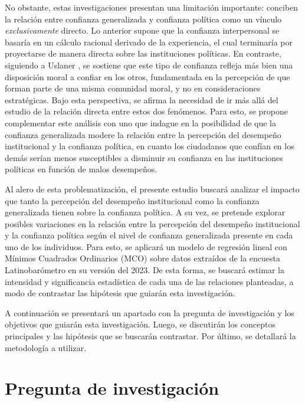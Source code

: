 \documentclass[12pt,twoside]{templates/facsothesis}
\begin{document}
No obstante, estas investigaciones presentan una limitación importante: conciben la relación entre confianza generalizada y confianza política como un vínculo \emph{exclusivamente} directo. Lo anterior supone que la confianza interpersonal se basaría en un cálculo racional derivado de la experiencia, el cual terminaría por proyectarse de manera directa sobre las instituciones políticas. En contraste, siguiendo a Uslaner \citetext{\citeyear{uslanerMoralFoundationsTrust2002}; \citeyear{uslanerStudyTrust2017}}, se sostiene que este tipo de confianza refleja más bien una disposición moral a confiar en los otros, fundamentada en la percepción de que forman parte de una misma comunidad moral, y no en consideraciones estratégicas. Bajo esta perspectiva, se afirma la necesidad de ir más allá del estudio de la relación directa entre estos dos fenómenos. Para esto, se propone complementar este análisis con uno que indague en la posibilidad de que la confianza generalizada modere la relación entre la percepción del desempeño institucional y la confianza política, en cuanto los ciudadanos que confían en los demás serían menos susceptibles a disminuir su confianza en las instituciones políticas en función de malos desempeños.

Al alero de esta problematización, el presente estudio buscará analizar el impacto que tanto la percepción del desempeño institucional como la confianza generalizada tienen sobre la confianza política. A su vez, se pretende explorar posibles variaciones en la relación entre la percepción del desempeño institucional y la confianza política según el nivel de confianza generalizada presente en cada uno de los individuos. Para esto, se aplicará un modelo de regresión lineal con Mínimos Cuadrados Ordinarios (MCO) sobre datos extraídos de la encuesta Latinobarómetro en su versión del 2023. De esta forma, se buscará estimar la intensidad y significancia estadística de cada una de las relaciones planteadas, a modo de contrastar las hipótesis que guiarán esta investigación.

A continuación se presentará un apartado con la pregunta de investigación y los objetivos que guiarán esta investigación. Luego, se discutirán los conceptos principales y las hipótesis que se buscarán contrastar. Por último, se detallará la metodología a utilizar.

\section{Pregunta de investigación}\label{pregunta-de-investigaciuxf3n}
\end{document}
